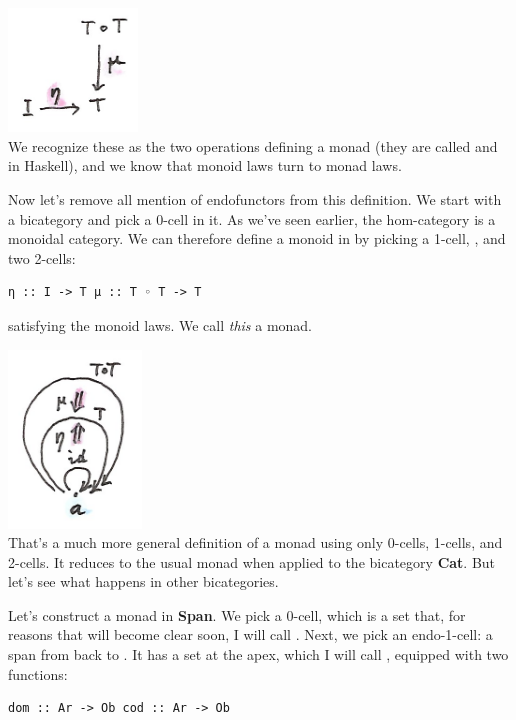\includegraphics[width=1.35417in]{images/monad.png}\\
We recognize these as the two operations defining a monad (they are
called  and  in Haskell), and we know that
monoid laws turn to monad laws.

Now let's remove all mention of endofunctors from this definition. We
start with a bicategory  and pick a 0-cell  in it.
As we've seen earlier, the hom-category  is a monoidal
category. We can therefore define a monoid in  by
picking a 1-cell, , and two 2-cells:

\begin{Verbatim}[commandchars=\\\{\}]
η :: I -> T μ :: T ◦ T -> T
\end{Verbatim}

satisfying the monoid laws. We call \emph{this} a monad.

\includegraphics[width=1.39583in]{images/bimonad.png}\\
That's a much more general definition of a monad using only 0-cells,
1-cells, and 2-cells. It reduces to the usual monad when applied to the
bicategory \textbf{Cat}. But let's see what happens in other
bicategories.

Let's construct a monad in \textbf{Span}. We pick a 0-cell, which is a
set that, for reasons that will become clear soon, I will call
. Next, we pick an endo-1-cell: a span from  back
to . It has a set at the apex, which I will call ,
equipped with two functions:

\begin{Verbatim}[commandchars=\\\{\}]
dom :: Ar -> Ob cod :: Ar -> Ob
\end{Verbatim}

